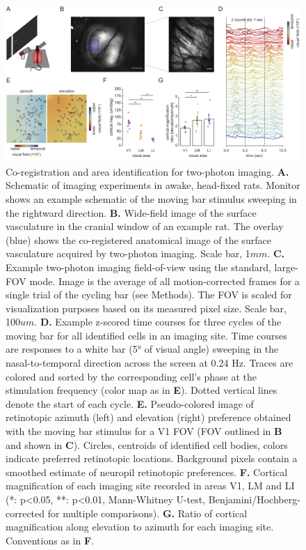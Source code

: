 \begin{figure}[t!]
    \includegraphics[width=\textwidth]{figures/chapter_3/fig_3-2_2p_retino/fig_3-2_2p_retino.pdf}
    \vspace{.1in}
    \caption[Area identification]{Co-registration and area identification for two-photon imaging. 
    \textbf{A.} Schematic of imaging experiments in awake, head-fixed rats. Monitor shows an example schematic of the moving bar stimulus sweeping in the rightward direction. 
    \textbf{B.} Wide-field image of the surface vasculature in the cranial window of an example rat. The overlay (blue) shows the co-registered anatomical image of the surface vasculature acquired by two-photon imaging. Scale bar, 1$mm$. 
    \textbf{C.} Example two-photon imaging field-of-view using the standard, large-FOV mode. Image is the average of all motion-corrected frames for a single trial of the cycling bar (see Methods). The FOV is scaled for visualization purposes based on its measured pixel size. Scale bar, 100$um$. 
    \textbf{D.} Example z-scored time courses for three cycles of the moving bar for all identified cells in an imaging site. Time courses are responses to a white bar (\ang{5} of visual angle) sweeping in the nasal-to-temporal direction across the screen at 0.24 Hz. Traces are colored and sorted by the corresponding cell's phase at the stimulation frequency (color map as in \textbf{E}). Dotted vertical lines denote the start of each cycle. 
    \textbf{E.} Pseudo-colored image of retinotopic azimuth (left) and elevation (right) preference obtained with the moving bar stimulus for a V1 FOV (FOV outlined in \textbf{B} and shown in \textbf{C}). Circles, centroids of identified cell bodies, colors indicate preferred retinotopic locations. Background pixels contain a smoothed estimate of neuropil retinotopic preferences. 
    \textbf{F.} Cortical magnification of each imaging site recorded in areas V1, LM and LI (*: p<0.05, **: p<0.01, Mann-Whitney U-test, Benjamini/Hochberg-corrected for multiple comparisons). 
    \textbf{G.} Ratio of cortical magnification along elevation to azimuth for each imaging site. Conventions as in \textbf{F}.   
    \label{fig:2p_retino}}
\end{figure}

